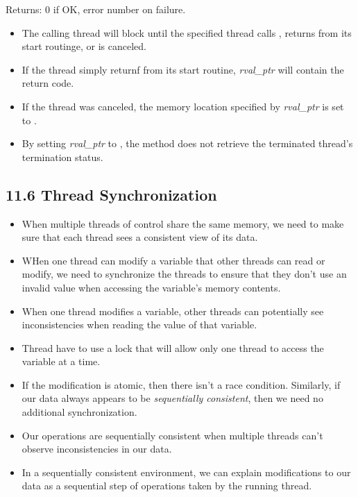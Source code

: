 \documentclass[]{article}
\begin{document}


Returns: 0 if OK, error number on failure.

\begin{itemize}
\item The calling thread will block until the specified thread calls
, returns from its start routinge, or is canceled.
\item If the thread simply returnf from its start routine, \emph{rval\_ptr} will
contain the return code.
\item If the thread was canceled, the memory location specified by
\emph{rval\_ptr} is set to .
\item By setting \emph{rval\_ptr} to , the method does not retrieve
the terminated thread's termination status.
\end{itemize}

\subsection*{11.6 Thread Synchronization}
\begin{itemize}
\item When multiple threads of control share the same memory, we need to make
sure that each thread sees a consistent view of its data.
\item WHen one thread can modify a variable that other threads can read or
modify, we need to synchronize the threads to ensure that they don't use an
invalid value when accessing the variable's memory contents.
\item When one thread modifies a variable, other threads can potentially see
inconsistencies when reading the value of that variable.
\item Thread have to use a lock that will allow only one thread to access the
variable at a time.
\item If the modification is atomic, then there isn't a race condition.
Similarly, if our data always appears to be \emph{sequentially consistent}, then
we need no additional synchronization.
\item Our operations are sequentially consistent when multiple threads can't
observe inconsistencies in our data.
\item In a sequentially consistent environment, we can explain modifications to
our data as a sequential step of operations taken by the running thread.
\end{itemize}
\end{document}
